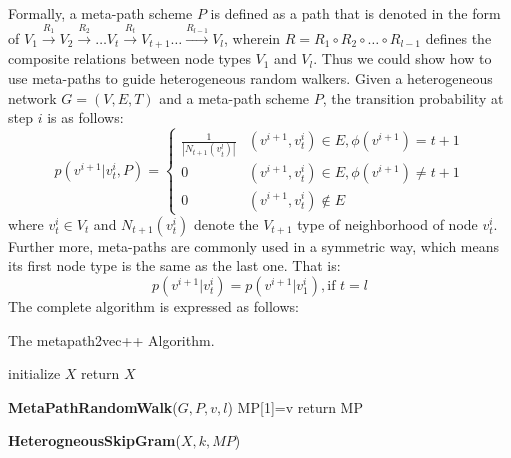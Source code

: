 \documentclass[conference]{IEEEtran}
\begin{document}
Formally, a meta-path scheme $P$ is defined as a path that is denoted in the form of $V_1 \xrightarrow{R_1}V_2\xrightarrow{R_2}\dots V_t\xrightarrow{R_t}V_{t+1}\dots\xrightarrow{R_{l-1}}V_l$, wherein $R=R_1 \circ R_2 \circ \dots \circ R_{l-1}$ defines the composite relations between node types $V_1$ and $V_l$. Thus we could show how to use meta-paths to guide heterogeneous random walkers. Given a heterogeneous network $G=(V,E,T)$ and a meta-path scheme $P$, the transition probability at step $i$ is as follows:
\begin{equation}
	p(v^{i+1}|v_t^i,P)=\begin{cases}
		\frac{1}{|N_{t+1}(v_t^l)|}&(v^{i+1},v_t^i)\in E,\phi(v^{i+1})=t+1\\0&(v^{i+1},v_t^i)\in E,\phi(v^{i+1})\neq t+1\\0&(v^{i+1},v_t^i)\notin E
	\end{cases}
\label{equ:tran}
\end{equation}
where $v_t^i\in V_t$ and $N_{t+1}(v_t^i)$ denote the $V_{t+1}$ type of neighborhood of node $v_t^i$. Further more, meta-paths are commonly used in a symmetric way, which means its first node type is the same as the last one. That is:
\begin{equation}
	p(v^{i+1}|v_t^i)=p(v^{i+1}|v_1^i),\text{if } t=l
\end{equation}
The complete algorithm is expressed as follows:
\begin{algorithm}[h]
  \caption{The metapath2vec++ Algorithm.}  
  initialize $X$\;  
  {
  }
  return $X$\;
  
  \textbf{MetaPathRandomWalk}($G,P,v,l$)
  MP[1]=v\;
  return MP\;
  
  \textbf{HeterogneousSkipGram}($X,k,MP$)
\end{algorithm}  
\end{document}
